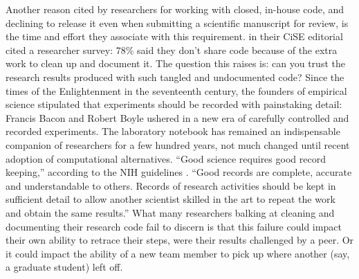 \documentclass{statement}
\newlength{\up}
\begin{document}
Another reason cited by researchers for working with closed, in-house code, and declining to release it even when submitting a scientific manuscript for review, is the time and effort they associate with this requirement. 
\cite{leveque2012} in their CiSE editorial cited a researcher survey: 78\% said they don't share code because of the extra work to clean up and document it. 
The question this raises is: can you trust the research results produced with such tangled and undocumented code? 
Since the times of the Enlightenment in the seventeenth century, the founders of empirical science stipulated that experiments should be recorded with painstaking detail: 
Francis Bacon and Robert Boyle ushered in a new era of carefully controlled and recorded experiments. 
The laboratory notebook has remained an indispensable companion of researchers for a few hundred years, not much changed until recent adoption of computational alternatives. 
``Good science requires good record keeping,'' according to the NIH guidelines \citep{nih2008guidelines}.
``Good records are complete, accurate and understandable to others. 
Records of research activities should be kept in sufficient detail to allow another scientist skilled in the art to repeat the work and obtain the same results.'' 
What many researchers balking at cleaning and documenting their research code fail to discern is that this failure could impact their own ability to retrace their steps, were their results challenged by a peer. 
Or it could impact the ability of a new team member to pick up where another (say, a graduate student) left off. 
\end{document}
